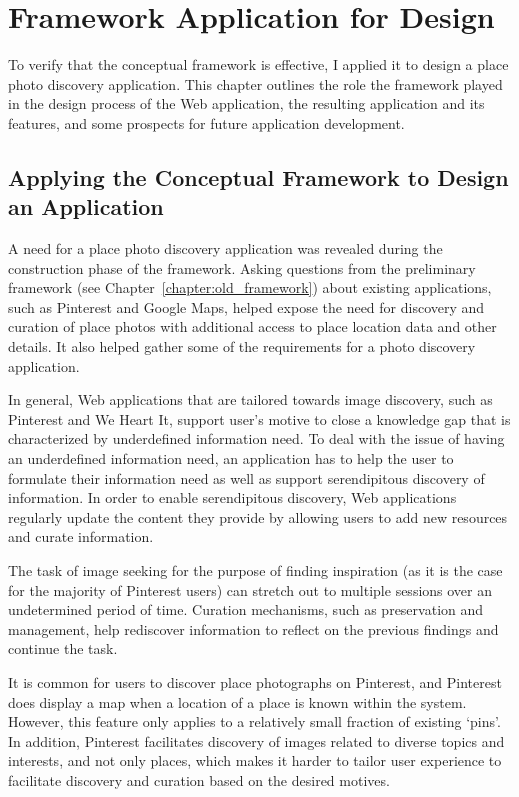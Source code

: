 \chapter{Framework Application for Design}
\label{chapter:application}

To verify that the conceptual framework is effective, I applied it to design a place photo discovery application. This chapter outlines the role the framework played in the design process of the Web application, the resulting application and its features, and some prospects for future application development. 

{\section{Applying the Conceptual Framework to Design an Application}
A need for a place photo discovery application was revealed during the construction phase of the framework. Asking questions from the preliminary framework (see Chapter~\ref{chapter:old_framework}) about existing applications, such as Pinterest and Google Maps, helped expose the need for discovery and curation of place photos with additional access to place location data and other details. It also helped gather some of the requirements for a photo discovery application.

In general, Web applications that are tailored towards image discovery, such as Pinterest and We Heart It, support user's motive to close a knowledge gap that is characterized by underdefined information need. To deal with the issue of having an underdefined information need, an application has to help the user to formulate their information need as well as support serendipitous discovery of information. In order to enable serendipitous discovery, Web applications regularly update the content they provide by allowing users to add new resources and curate information. 

The task of image seeking for the purpose of finding inspiration (as it is the case for the majority of Pinterest users) can stretch out to multiple sessions over an undetermined period of time. Curation mechanisms, such as preservation and management, help rediscover information to reflect on the previous findings and continue the task.  

It is common for users to discover place photographs on Pinterest, and Pinterest does display a map when a location of a place is known within the system. However, this feature only applies to a relatively small fraction of existing `pins'. In addition, Pinterest facilitates discovery of images related to diverse topics and interests, and not only places, which makes it harder to tailor user experience to facilitate discovery and curation based on the desired motives. 

}
